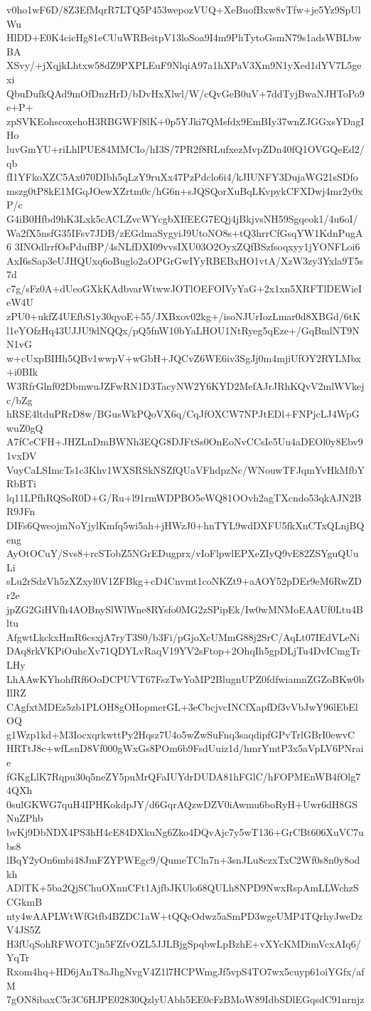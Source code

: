 v0ho1wF6D/8Z3EfMqrR7LTQ5P453wepozVUQ+XeBuofBxw8vTfw+je5Yz9SpUlWu
HlDD+E0K4cicHg81eCUuWRBeitpV13loSoa9I4m9PhTytoGsmN79s1adsWBLbwBA
XSvy/+jXqjkLhtxw58dZ9PXPLEuF9NlqiA97a1hXPaV3Xm9N1yXed1dYV7L5gexi
QbuDufkQAd9mOfDnzHrD/bDvHxXlwl/W/cQvGeB0uV+7ddTyjBwaNJHToPo9e+P+
zpSVKEohscoxehoH3RBGWFf8lK+0p5YJki7QMsfdx9EmBIy37wnZJGGxsYDagIHo
luvGmYU+riLhlPUE84MMCIo/hI3S/7PR2f8RLufxezMvpZDn40fQ1OVGQeEd2/qb
fI1YFkoXZC5Ax070DIbh5qLzY9ruXx47PzPdclo6i4/kJIUNFY3DujaWG21sSDfo
mszg0tP8kE1MGqJOewXZrtm0c/hG6n+sJQSQorXuBqLKvpykCFXDwj4mr2y0xP/c
G4iB0Hfbd9hK3Lxk5cACLZvcWYcgbXIfEEG7EQj4jBkjvsNH59Sgqeok1/4u6oI/
Wa2fX5nsfG35IFsv7JDB/zEGdmaSygyiJ9UtoNO8s+tQ3hrrCfGsqYW1KdnPugA6
3INOdlrrfOsPdufBP/4sNLfDXI09vvsIXU03O2OyxZQfBSzfsoqxyy1jYONFLoi6
AxI6sSap3eUJHQUxq6oBuglo2aOPGrGwIYyRBEBxHO1vtA/XzW3zy3Yxla9T5s7d
c7g/sFz0A+dUeoGXkKAdbvarWtwwJOTlOEFOIVyYaG+2x1xn5XRFTlDEWieIeW4U
zPU0+ukfZ4UEfbS1y30qyoE+55/JXBxov02kg+/isoNJUrIozLmar0d8XBGd/6tK
l1eYOfzHq43UJJU9dNQQx/pQ5fnW10bYaLHOU1NtRyeg5qEze+/GqBmlNT9NN1vG
w+cUxpBIHh5QBv1wwpV+wGbH+JQCvZ6WE6iv3SgJj0m4mjiUfOY2RYLMbx+i0BIk
W3RfrGlnf02DbmwuJZFwRN1D3TacyNW2Y6KYD2MefAJrJRhKQvV2mlWVkejc/bZg
hRSE4ltduPRrD8w/BGusWkPQoVX6q/CqJfOXCW7NPJtEDl+FNPjcLJ4WpGwuZ0gQ
A7fCeCFH+JHZLnDmBWNh3EQG8DJFtSs0OnEoNvCCsIe5Uu4aDEOl0y8Ebv91vxDV
VuyCaLSImcTs1c3Khv1WXSRSkNSZfQUaVFhdpzNc/WNouwTFJqmYvHkMfbYRbBTi
lq11LPfhRQSoR0D+G/Ru+l91rmWDPBO5eWQ81OOvh2agTXcndo53qkAJN2BR9JFn
DIFs6QweojmNoYjylKmfq5wi5ah+jHWzJ0+hnTYL9wdDXFU5fkXnCTxQLnjBQeng
AyOtOCuY/Svs8+rcSTobZ5NGrEDugprx/vIoFlpwlEPXeZIyQ9vE82ZSYguQUuLi
sLu2rSdzVh5zXZxyl0V1ZFBkg+cD4Cnvmt1coNKZt9+aAOY52pDEr9eM6RwZDr2e
jpZG2GiHVfh4AOBnySlWlWne8RYsfo0MG2zSPipEk/Iw0wMNMoEAAUf0Ltu4Bltu
AfgwtLkckxHmR6csxjA7ryT3S0/b3Fi/pGjoXcUMmG88j2SrC/AqLt07IEdVLeNi
DAq8rkVKPiOuhcXv71QDYLvRaqV19YV2sFtop+2OhqIh5gpDLjTu4DvICmgTrLHy
LhAAwKYhohfRf6OoDCPUVT67FszTwYoMP2BlugnUPZ0fdfwiamnZGZoBKw0bIlRZ
CAgfxtMDEz5zb1PLOH8gOHopmerGL+3eCbcjvcINCfXapfDf3vVbJwY96lEbElOQ
g1Wzp1kd+M3IocxqrkwttPy2Hqsz7U4o5wZwSuFnq3saqdipfGPvTrlGBrI0ewvC
HRTtJ8c+wfLsnD8Vf000gWxGs8POm6b9FsdUuiz1d/hmrYmtP3x5aVpLV6PNraie
fGKgLlK7Rqpu30q5neZY5puMrQFaIUYdrDUDA81hFGlC/hFOPMEnWB4fOlg74QXh
0sulGKWG7quH4IPHKokdpJY/d6GqrAQzwDZV0iAwmu6boRyH+Uwr6dH8GSNuZPhb
bvKj9DbNDX4PS3hH4cE84DXkuNg6Zko4DQvAjc7y5wT136+GrCBt606XuVC7ubs8
lBqY2yOn6mbi48JmFZYPWEgc9/QumeTCln7n+3snJLu8czxTxC2Wf0s8n0y8odkh
ADlTK+5ba2QjSChuOXnnCFt1AjfbJKUlo68QULh8NPD9NwxRspAmLLWchzSCGkmB
nty4wAAPLWtWfGtfb4BZDC1aW+tQQcOdwz5aSmPD3wgeUMP4TQrhyJweDzV4JS5Z
H3fUqSohRFWOTCjn5FZfvOZL5JJLBjgSpqbwLpBzhE+vXYcKMDimVcxAIq6/YqTr
Rxom4hq+HD6jAnT8aJhgNvgV4Z1l7HCPWmgJf5vpS4TO7wx5cuyp61oiYGfx/afM
7gON8ibaxC5r3C6HJPE02830QzlyUAbh5EE0cFzBMoW89IdbSDlEGqsdC91nrnjz
